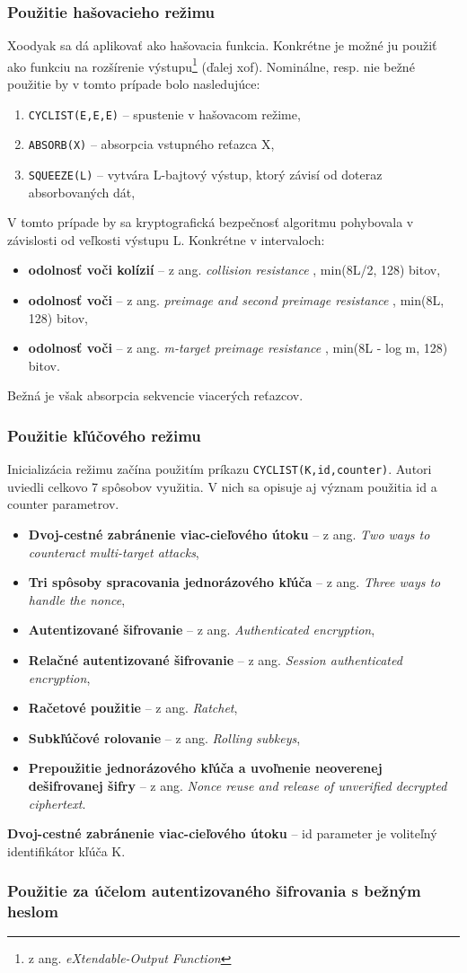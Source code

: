 \subsubsection{Použitie hašovacieho režimu}
Xoodyak sa dá aplikovať ako hašovacia funkcia. Konkrétne je možné ju použiť ako funkciu na rozšírenie výstupu\footnote{z ang. \textit{eXtendable-Output Function}} (ďalej \acrshort{xof}). Nominálne, resp. nie bežné použitie by v tomto prípade bolo nasledujúce: 
\begin{enumerate}
	\item \lstinline|CYCLIST(E,E,E)| -- spustenie v hašovacom režime,
 	\item \lstinline|ABSORB(X)| -- absorpcia vstupného reťazca X,
 	\item \lstinline|SQUEEZE(L)| -- vytvára L-bajtový výstup, ktorý závisí od doteraz absorbovaných dát,
\end{enumerate}
V tomto prípade by sa kryptografická bezpečnosť algoritmu pohybovala v závislosti od veľkosti výstupu L. Konkrétne v intervaloch:
\begin{itemize}
	\item{\textbf{odolnosť voči kolízií}} -- z ang. \textit{collision resistance} \cite{cr}, min(8L/2, 128) bitov,
	\item{\textbf{odolnosť voči }} -- z ang. \textit{preimage and second preimage resistance} \cite{pa}, min(8L, 128) bitov,
	\item{\textbf{odolnosť voči}} -- z ang. \textit{m-target preimage resistance} \cite{pa}, min(8L - log m, 128) bitov.
\end{itemize}
Bežná je však absorpcia sekvencie viacerých reťazcov.

\subsubsection{Použitie kľúčového režimu}
Inicializácia režimu začína použitím príkazu \lstinline|CYCLIST(K,id,counter)|. Autori uviedli celkovo 7 spôsobov využitia. V nich sa opisuje aj význam použitia id a counter parametrov.
\begin{itemize}
	\item{\textbf{Dvoj-cestné zabránenie viac-cieľového útoku}} -- z ang. \textit{Two ways to counteract multi-target attacks},
	\item{\textbf{Tri spôsoby spracovania jednorázového kľúča}} -- z ang. \textit{Three ways to handle the nonce},
	\item{\textbf{Autentizované šifrovanie}} -- z ang. \textit{Authenticated encryption},
	\item{\textbf{Relačné autentizované šifrovanie}} -- z ang. \textit{Session authenticated encryption},
	\item{\textbf{Račetové použitie}} -- z ang. \textit{Ratchet},
	\item{\textbf{Subkľúčové rolovanie}} -- z ang. \textit{Rolling subkeys},
	\item{\textbf{Prepoužitie jednorázového kľúča a uvoľnenie neoverenej dešifrovanej šifry}} -- z ang. \textit{Nonce reuse and release of unverified decrypted ciphertext}.
\end{itemize}

\textbf{Dvoj-cestné zabránenie viac-cieľového útoku} -- id parameter je voliteľný identifikátor kľúča K.   

\subsubsection{Použitie za účelom autentizovaného šifrovania s bežným heslom}